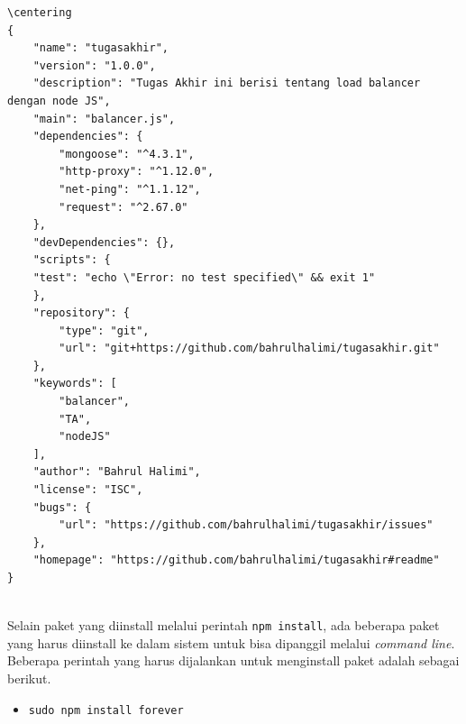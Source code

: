 \documentclass{ta-its}
\begin{document}
			\begin{lstlisting}[frame=single,tabsize=2,breaklines,caption={Isi Package.Json},label=packageJson]
			\centering
{
	"name": "tugasakhir",
	"version": "1.0.0",
	"description": "Tugas Akhir ini berisi tentang load balancer dengan node JS",
	"main": "balancer.js",
	"dependencies": {
		"mongoose": "^4.3.1",
		"http-proxy": "^1.12.0",
		"net-ping": "^1.1.12",
		"request": "^2.67.0"
	},
	"devDependencies": {},
	"scripts": {
	"test": "echo \"Error: no test specified\" && exit 1"
	},
	"repository": {
		"type": "git",
		"url": "git+https://github.com/bahrulhalimi/tugasakhir.git"
	},
	"keywords": [
		"balancer",
		"TA",
		"nodeJS"
	],
	"author": "Bahrul Halimi",
	"license": "ISC",
	"bugs": {
		"url": "https://github.com/bahrulhalimi/tugasakhir/issues"
	},
	"homepage": "https://github.com/bahrulhalimi/tugasakhir#readme"
}
				
			\end{lstlisting}
			
			Selain paket yang diinstall melalui perintah \texttt{npm install}, ada beberapa paket yang harus diinstall ke dalam sistem untuk bisa dipanggil melalui \textit{command line}. Beberapa perintah yang harus dijalankan untuk menginstall paket adalah sebagai berikut.
			
			\begin{itemize}
				\item \texttt{sudo npm install forever}
			\end{itemize}
        

\appendix %

\backmatter %
\end{document}
